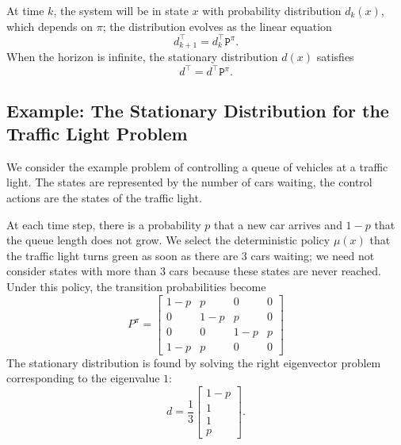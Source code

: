 At time $k$, the system will be in state $x$ with probability distribution $d_k(x)$, which depends on $\pi$; the distribution evolves as the linear equation
\begin{equation*}
  d_{k+1}^\top = d_k^\top \mathtt{P}^\pi.
\end{equation*}
When the horizon is infinite, the stationary distribution $d(x)$ satisfies
\begin{equation*}
  d^\top = d^\top \mathtt{P}^\pi.
\end{equation*}


\subsection{Example: The Stationary Distribution for the Traffic Light Problem}

We consider the  example problem of controlling a queue of vehicles at a traffic light. The states are represented by the number of cars waiting, the control actions are the states of the traffic light.

At each time step, there is a probability $p$ that a new car arrives and $1-p$ that the queue length does not grow. We select the deterministic policy $\mu(x)$ that the traffic light turns green as soon as there are 3 cars waiting; we need not consider states with more than 3 cars because these states are never reached. Under this policy, the transition probabilities become
\begin{equation*}
  P^\pi =
  \begin{bmatrix}
    1-p & p & 0 & 0 \\
    0 & 1-p & p & 0 \\
    0 & 0 & 1-p & p \\
    1-p & p & 0 & 0
  \end{bmatrix}
\end{equation*}
The stationary distribution is found by solving the right eigenvector problem corresponding to the eigenvalue $1$:
\begin{equation*}
  d =
  \frac{1}{3}\begin{bmatrix}
               1-p \\ 1 \\ 1 \\ p
  \end{bmatrix}.
\end{equation*}

